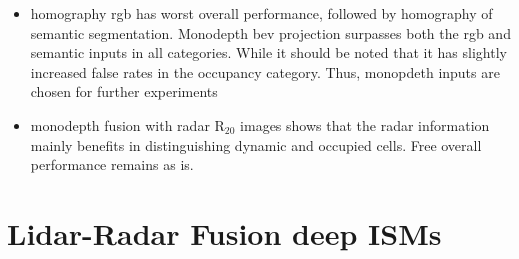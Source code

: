 \begin{itemize}
	\item homography rgb has worst overall performance, followed by homography of semantic segmentation. Monodepth \gls{bev} projection surpasses both the rgb and semantic inputs in all categories. While it should be noted that it has slightly increased false rates in the occupancy category. Thus, monopdeth inputs are chosen for further experiments
	\item monodepth fusion with radar R$_{20}$ images shows that the radar information mainly benefits in distinguishing dynamic and occupied cells. Free overall performance remains as is.
\end{itemize}

%
\section{Lidar-Radar Fusion deep ISMs}
\label{sec:lidar_radar_fusion_in_deep_isms}
%
